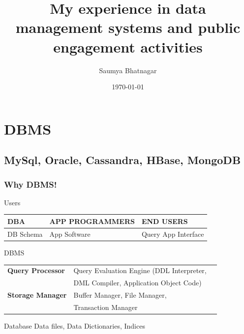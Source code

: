 \documentclass{beamer}
\title[DBMS]{My experience in data management systems and public engagement activities} %
\author{Saumya Bhatnagar} %
\date{\today} %
\begin{document}
\begin{frame}
\titlepage %
\end{frame}



\section{DBMS} %


\subsection{MySql, Oracle, Cassandra, HBase, MongoDB} %

\begin{frame}
	\frametitle{Why DBMS!}
		\begin{block}{Users}
		\begin{table}
			\begin{tabular}{l l l}
				\textbf{DBA} & \textbf{APP PROGRAMMERS} & \textbf{END USERS}\\
				\midrule
				DB Schema & App Software & Query App Interface \\
			\end{tabular}
		\end{table}
		\end{block}
	
	\begin{block}{DBMS}
	\begin{table}
		\begin{tabular}{l l l}
			\textbf{Query Processor} & Query Evaluation Engine (DDL Interpreter,\\ 
			 & DML Compiler, Application Object Code) \\
			\midrule
			\textbf{Storage Manager} & Buffer Manager, File Manager, \\ & Transaction Manager \\
		\end{tabular}
	\end{table}
	\end{block}

	\begin{block}{Database}
	Data files, Data Dictionaries, Indices
	\end{block}

\end{frame}
\end{document}
